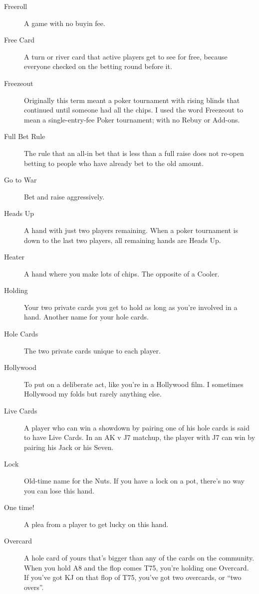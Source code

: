 \begin{description}
\item[Freeroll] A game with no buyin fee.

\item[Free Card] A turn or river card that active players get to see
for free, because everyone checked on the betting round before it.

\item[Freezeout] Originally this term meant a poker tournament with
rising blinds that continued until someone had all the chips. I used
the word Freezeout to mean a single-entry-fee Poker tournament; with
no Rebuy or Add-ons.

\item[Full Bet Rule] The rule that an all-in bet that is less than a
full raise does not re-open betting to people who have already bet to
the old amount.

\item[Go to War] Bet and raise aggressively.

\item[Heads Up] A hand with just two players remaining. When a poker
tournament is down to the last two players, all remaining hands are
Heads Up.

\item[Heater] A hand where you make lots of chips. The opposite of a
Cooler.

\item[Holding] Your two private cards you get to hold as long as
you're involved in a hand. Another name for your hole cards.

\item[Hole Cards] The two private cards unique to each player.

\item[Hollywood] To put on a deliberate act, like you're in a
Hollywood film. I sometimes Hollywood my folds but rarely anything
else.

\item[Live Cards] A player who can win a showdown by pairing one of
his hole cards is said to have Live Cards. In an AK v J7 matchup, the
player with J7 can win by pairing his Jack or his Seven.

\item[Lock] Old-time name for the Nuts. If you have a lock on a pot,
there's no way you can lose this hand.

\item[One time!] A plea from a player to get lucky on this hand.

\item[Overcard] A hole card of yours that's bigger than any of the
cards on the community. When you hold A8 and the flop comes T75,
you're holding one Overcard. If you've got KJ on that flop of T75,
you've got two overcards, or ``two overs''.


\end{description}
